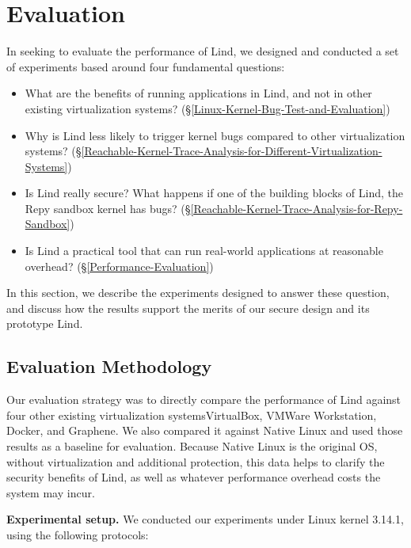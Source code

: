 \section{Evaluation}
\label{sec.evaluation}

In seeking to evaluate the performance of Lind, 
we designed and conducted a set of experiments based around four
fundamental 
questions:

\begin{itemize}
\item What are the benefits of running applications in Lind, 
and not in other existing virtualization systems?
(\S{\ref{Linux-Kernel-Bug-Test-and-Evaluation}})

\item Why is Lind less likely to trigger kernel bugs compared to 
other virtualization systems?
(\S{\ref{Reachable-Kernel-Trace-Analysis-for-Different-Virtualization-Systems}})

\item Is Lind really secure? What happens if one of the building blocks
of Lind, 
the Repy sandbox kernel has bugs?
(\S{\ref{Reachable-Kernel-Trace-Analysis-for-Repy-Sandbox}})

\item Is Lind a practical tool that can run real-world applications at
reasonable overhead? 
(\S{\ref{Performance-Evaluation}})
\end{itemize}

In this section, we describe the experiments designed to answer these
question, 
and discuss how the results support the merits of our secure design and its
prototype Lind. 

\subsection{Evaluation Methodology}

Our evaluation strategy was to directly compare the performance of Lind
against 
four other existing virtualization systems\textendash VirtualBox, VMWare
Workstation, 
Docker, and Graphene. We also compared it against Native Linux and used 
those results as a baseline for evaluation. Because Native Linux is the
original OS, 
without virtualization and additional protection, this data helps to
clarify the security benefits of Lind, 
as well as whatever performance overhead costs the system may incur.

\textbf{Experimental setup.}
We conducted our experiments under Linux kernel 3.14.1, using the following
protocols:

